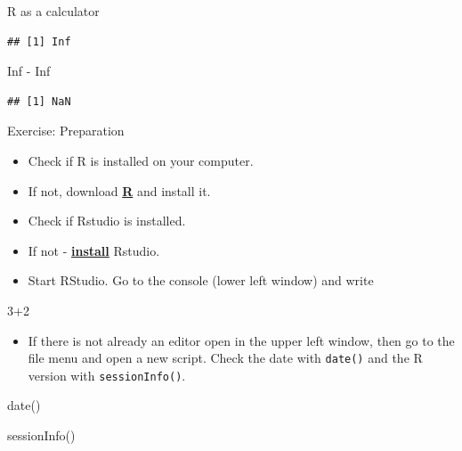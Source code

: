 \documentclass[
  10pt,
  ignorenonframetext,
]{beamer}
\newenvironment{Shaded}{\begin{snugshade}}{\end{snugshade}}
\newcommand{\DecValTok}[1]{\textcolor[rgb]{0.86,0.86,0.80}{#1}}
\newcommand{\KeywordTok}[1]{\textcolor[rgb]{0.94,0.87,0.69}{#1}}
\newcommand{\NormalTok}[1]{\textcolor[rgb]{0.80,0.80,0.80}{#1}}
\newcommand{\OperatorTok}[1]{\textcolor[rgb]{0.94,0.94,0.82}{#1}}
\newcommand{\OtherTok}[1]{\textcolor[rgb]{0.94,0.94,0.56}{#1}}
\newcommand{\StringTok}[1]{\textcolor[rgb]{0.80,0.58,0.58}{#1}}
\providecommand{\tightlist}{%
  \setlength{\itemsep}{0pt}\setlength{\parskip}{0pt}}
\begin{document}
\begin{frame}[fragile]{R as a calculator}
\begin{verbatim}
## [1] Inf
\end{verbatim}

\begin{Shaded}
\begin{Highlighting}[]
\OtherTok{Inf} \OperatorTok{-}\StringTok{ }\OtherTok{Inf}
\end{Highlighting}
\end{Shaded}

\begin{verbatim}
## [1] NaN
\end{verbatim}

\end{frame}

\begin{frame}[fragile]{Exercise: Preparation}
\protect\hypertarget{exercise-preparation}{}

\begin{itemize}
\tightlist
\item
  Check if R is installed on your computer.
\item
  If not, download \href{r-project.org}{\textbf{R}} and install it.
\item
  Check if Rstudio is installed.
\item
  If not - \href{http://www.rstudio.com/}{\textbf{install}} Rstudio.
\item
  Start RStudio. Go to the console (lower left window) and write
\end{itemize}

\begin{Shaded}
\begin{Highlighting}[]
\DecValTok{3}\OperatorTok{+}\DecValTok{2}
\end{Highlighting}
\end{Shaded}

\begin{itemize}
\tightlist
\item
  If there is not already an editor open in the upper left window, then
  go to the file menu and open a new script. Check the date with
  \texttt{date()} and the R version with \texttt{sessionInfo()}.
\end{itemize}

\begin{Shaded}
\begin{Highlighting}[]
\KeywordTok{date}\NormalTok{()}
\end{Highlighting}
\end{Shaded}

\begin{Shaded}
\begin{Highlighting}[]
\KeywordTok{sessionInfo}\NormalTok{()}
\end{Highlighting}
\end{Shaded}

\end{frame}
\end{document}
